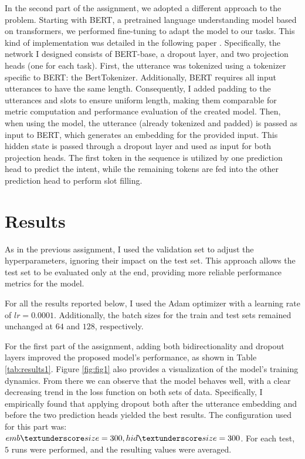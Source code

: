 \documentclass[a4paper]{article}
\begin{document}
In the second part of the assignment, we adopted a different approach to the problem. Starting with BERT, a pretrained language understanding model based on transformers, we performed fine-tuning to adapt the model to our tasks.
This kind of implementation was detailed in the following paper \cite{BERT}. Specifically, the network I designed consists of BERT-base, a dropout layer, and two projection heads (one for each task).
First, the utterance was tokenized using a tokenizer specific to BERT: the BertTokenizer.
Additionally, BERT requires all input utterances to have the same length. Consequently, I added padding to the utterances and slots to ensure uniform length, making them comparable for metric computation and performance evaluation of the created model.
Then, when using the model, the utterance (already tokenized and padded) is passed as input to BERT, which generates an embedding for the provided input. This hidden state is passed through a dropout layer and used as input for both projection heads. The first token in the sequence is utilized by one prediction head to predict the intent, while the remaining tokens are fed into the other prediction head to perform slot filling.

\section{Results}
As in the previous assignment, I used the validation set to adjust the hyperparameters, ignoring their impact on the test set. This approach allows the test set to be evaluated only at the end, providing more reliable performance metrics for the model.

For all the results reported below, I used the Adam optimizer with a learning rate of \(lr = 0.0001\). Additionally, the batch sizes for the train and test sets remained unchanged at \(64\) and \(128\), respectively.

For the first part of the assignment, adding both bidirectionality and dropout layers improved the proposed model’s performance, as shown in Table \ref{tab:results1}. 
Figure \ref{fig:fig1} also provides a visualization of the model's training dynamics. From there we can observe that the model behaves well, with a clear decreasing trend in the loss function on both sets of data.
Specifically, I empirically found that applying dropout both after the utterance embedding and before the two prediction heads yielded the best results.
The configuration used for this part was: \(emb \textunderscore size=300, hid \textunderscore size=300\).
For each test, \(5\) runs were performed, and the resulting values were averaged.
\end{document}
